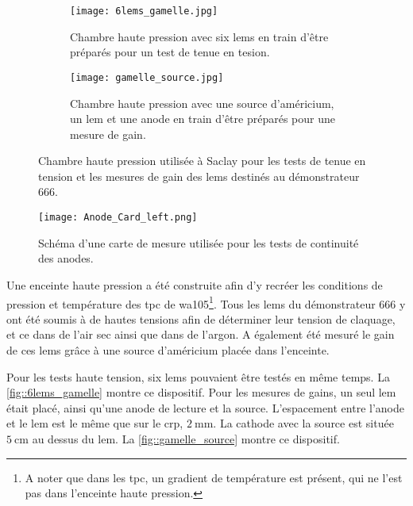             \begin{figure}[htpb]
                \begin{subfigure}[t]{0.48\textwidth}
                    \texttt{[image: 6lems\_gamelle.jpg]}
                    \caption{Chambre haute pression avec six \glspl{lem} en train d'être préparés pour un test de tenue en tesion.}
                    \label{fig::6lems_gamelle}
                \end{subfigure}
                \hfill
                \begin{subfigure}[t]{0.48\textwidth}
                    \texttt{[image: gamelle\_source.jpg]}
                    \caption{Chambre haute pression avec une source d'américium, un \gls{lem} et une anode en train d'être préparés pour une mesure de gain.}
                    \label{fig::gamelle_source}
                \end{subfigure}
                \caption[Chambre haute pression]{Chambre haute pression utilisée à Saclay pour les tests de tenue en tension et les mesures de gain des \glspl{lem} destinés au démonstrateur 666.}
                \label{fig::gamelle}
            \end{figure}

            \begin{wrapfigure}{r}{0.05\textwidth}
                \texttt{[image: Anode\_Card\_left.png]}
                \caption[Schéma d'une carte de mesure utilisée pour les tests de continuité des anodes.]{Schéma d'une carte de mesure utilisée pour les tests de continuité des anodes.}
                \label{fig::Anode_Card_left}
            \end{wrapfigure}
            Une enceinte haute pression a été construite afin d'y recréer les conditions de pression et température des \gls{tpc} de \gls{wa105}\footnote{A noter que dans les \gls{tpc}, un gradient de température est présent, qui ne l'est pas dans l'enceinte haute pression.}. Tous les \glspl{lem} du démonstrateur 666 y ont été soumis à de hautes tensions afin de déterminer leur tension de claquage, et ce dans de l'air sec ainsi que dans de l'argon. A également été mesuré le gain de ces \glspl{lem} grâce à une source d'américium placée dans l'enceinte.
            
            Pour les tests haute tension, six \glspl{lem} pouvaient être testés en même temps. La \autoref{fig::6lems_gamelle} montre  ce dispositif. Pour les mesures de gains, un seul \gls{lem} était placé, ainsi qu'une anode de lecture et la source. L'espacement entre l'anode et le \gls{lem} est le même que sur le \gls{crp}, $\SI{2}{\milli\meter}$. La cathode avec la source est située $\SI{5}{\centi\meter}$ au dessus du \gls{lem}. La \autoref{fig::gamelle_source} montre ce dispositif.
        
